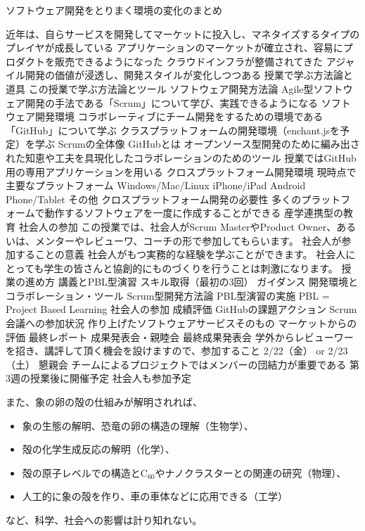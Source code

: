 \documentclass[11pt,a4paper,twoside]{jarticle}
\newcommand{\研究種別}{A}	%
\newcommand{\研究課題名}{コ・クリエイティブなソフトウェア開発者を育成するPBL型教育}
\newcommand{\研究機関名}{産業技術大学院大学}
\newcommand{\研究代表者氏名}{中鉢　欣秀}
\newcommand{\研究代表者氏名ふりがな}{ちゅうばち　よしひで}
\newcommand{\本応募effort}{\KLEffort{18}}	%
\newcommand{\研究期間の最終元号年度}{27}	%
\begin{document}
{ソフトウェア開発をとりまく環境の変化のまとめ

近年は、自らサービスを開発してマーケットに投入し、マネタイズするタイプのプレイヤが成長している
アプリケーションのマーケットが確立され、容易にプロダクトを販売できるようになった
クラウドインフラが整備されてきた
アジャイル開発の価値が浸透し、開発スタイルが変化しつつある
授業で学ぶ方法論と道具
この授業で学ぶ方法論とツール
ソフトウェア開発方法論
Agile型ソフトウェア開発の手法である「Scrum」について学び、実践できるようになる
ソフトウェア開発環境
コラボレーティブにチーム開発をするための環境である「GitHub」について学ぶ
クラスプラットフォームの開発環境（enchant.jsを予定）を学ぶ
Scrumの全体像
GitHubとは
オープンソース型開発のために編み出された知恵や工夫を具現化したコラボレーションのためのツール
授業ではGitHub用の専用アプリケーションを用いる
クロスプラットフォーム開発環境
現時点で主要なプラットフォーム
Windows/Mac/Linux
iPhone/iPad
Android Phone/Tablet
その他
クロスプラットフォーム開発の必要性
多くのプラットフォームで動作するソフトウェアを一度に作成することができる
産学連携型の教育
社会人の参加
この授業では、社会人がScrum MasterやProduct Owner、あるいは、メンターやレビューワ、コーチの形で参加してもらいます。
社会人が参加することの意義
社会人がもつ実務的な経験を学ぶことができます。
社会人にとっても学生の皆さんと協創的にものづくりを行うことは刺激になります。
授業の進め方
講義とPBL型演習
スキル取得（最初の3回）
ガイダンス
開発環境とコラボレーション・ツール
Scrum型開発方法論
PBL型演習の実施
PBL = Project Based Learning
社会人の参加
成績評価
GitHubの課題アクション
Scrum会議への参加状況
作り上げたソフトウェアサービスそのもの
マーケットからの評価
最終レポート
成果発表会・親睦会
最終成果発表会
学外からレビューワーを招き、講評して頂く機会を設けますので、参加すること
2/22（金） or 2/23（土）
懇親会
チームによるプロジェクトではメンバーの団結力が重要である
第3週の授業後に開催予定
社会人も参加予定


    
    また、象の卵の殻の仕組みが解明されれば、
	\begin{itemize}
		\item 象の生態の解明、恐竜の卵の構造の理解（生物学）、
		\item 殻の化学生成反応の解明（化学）、
		\item 殻の原子レベルでの構造とC$_{60}$やナノクラスターとの関連の研究（物理）、
		\item 人工的に象の殻を作り、車の車体などに応用できる（工学）
	\end{itemize}
	など、科学、社会への影響は計り知れない。

}
\end{document}
